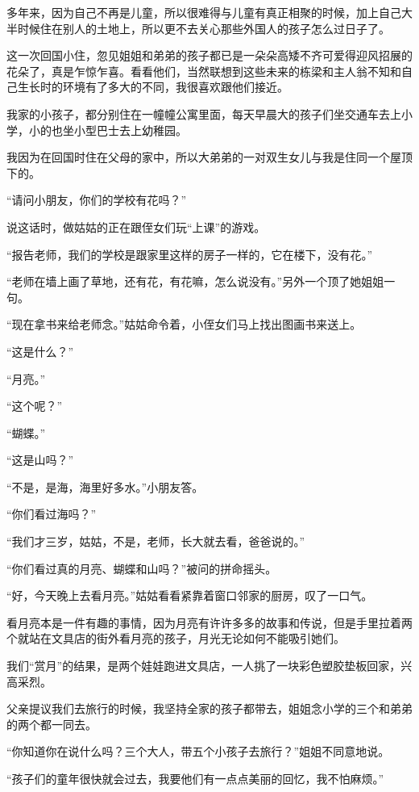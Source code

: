 \par 多年来，因为自己不再是儿童，所以很难得与儿童有真正相聚的时候，加上自己大半时候住在别人的土地上，所以更不去关心那些外国人的孩子怎么过日子了。
\par 这一次回国小住，忽见姐姐和弟弟的孩子都已是一朵朵高矮不齐可爱得迎风招展的花朵了，真是乍惊乍喜。看看他们，当然联想到这些未来的栋梁和主人翁不知和自己生长时的环境有了多大的不同，我很喜欢跟他们接近。
\par 我家的小孩子，都分别住在一幢幢公寓里面，每天早晨大的孩子们坐交通车去上小学，小的也坐小型巴士去上幼稚园。
\par 我因为在回国时住在父母的家中，所以大弟弟的一对双生女儿与我是住同一个屋顶下的。
\par “请问小朋友，你们的学校有花吗？”
\par 说这话时，做姑姑的正在跟侄女们玩“上课”的游戏。
\par “报告老师，我们的学校是跟家里这样的房子一样的，它在楼下，没有花。”
\par “老师在墙上画了草地，还有花，有花嘛，怎么说没有。”另外一个顶了她姐姐一句。
\par “现在拿书来给老师念。”姑姑命令着，小侄女们马上找出图画书来送上。
\par “这是什么？”
\par “月亮。”
\par “这个呢？”
\par “蝴蝶。”
\par “这是山吗？”
\par “不是，是海，海里好多水。”小朋友答。
\par “你们看过海吗？”
\par “我们才三岁，姑姑，不是，老师，长大就去看，爸爸说的。”
\par “你们看过真的月亮、蝴蝶和山吗？”被问的拼命摇头。
\par “好，今天晚上去看月亮。”姑姑看看紧靠着窗口邻家的厨房，叹了一口气。
\par 看月亮本是一件有趣的事情，因为月亮有许许多多的故事和传说，但是手里拉着两个就站在文具店的街外看月亮的孩子，月光无论如何不能吸引她们。
\par 我们“赏月”的结果，是两个娃娃跑进文具店，一人挑了一块彩色塑胶垫板回家，兴高采烈。
\par 父亲提议我们去旅行的时候，我坚持全家的孩子都带去，姐姐念小学的三个和弟弟的两个都一同去。
\par “你知道你在说什么吗？三个大人，带五个小孩子去旅行？”姐姐不同意地说。
\par “孩子们的童年很快就会过去，我要他们有一点点美丽的回忆，我不怕麻烦。”
